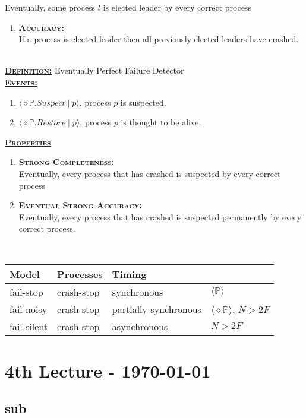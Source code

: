\documentclass{article}
\begin{document}
\begin{adjustwidth}{2em}{2em}
\begin{adjustwidth}{2em}{2em}
			Eventually, some process $l$ is elected leader by every correct process
			\begin{enumerate}[]
				\item \textbf{\textsc{Accuracy:}} \\
				If a process is elected leader then all previously elected leaders have crashed.
			\end{enumerate}
			\hfill \\
			\underline{\textbf{\textsc{Definition:}}} Eventually Perfect Failure Detector \\
			\underline{\textbf{\textsc{Events:}}} 
			\begin{enumerate}[]
				\item $\langle \diamond \mathbb{P}.\textit{Suspect} \mid p \rangle$, process $p$ is suspected.
				\item $\langle \diamond \mathbb{P}.\textit{Restore} \mid p \rangle$, process $p$ is thought to be alive.
			\end{enumerate}
			\underline{\textbf{\textsc{Properties}}}
			\begin{enumerate}[]
				\item \textbf{\textsc{Strong Completeness:}} \\
				Eventually, every process that has crashed is suspected by every correct process
				\item \textbf{\textsc{Eventual Strong Accuracy:}} \\
				Eventually, every process that has crashed is suspected permanently by every correct process.
			\end{enumerate}
			\hfill \\
			\begin{center}
				\begin{tabular}{|l|l|l|l|}
					\hline
					Model & Processes & Timing & \\
					\hline
					fail-stop & crash-stop & synchronous & $\langle \mathbb{P} \rangle$ \\
					fail-noisy & crash-stop & partially synchronous & $\langle \diamond\mathbb{P} \rangle$, $N > 2F$ \\
					fail-silent & crash-stop & asynchronous & $N > 2F$ \\
					\hline
				\end{tabular}
			\end{center}
		\end{adjustwidth}
	\end{adjustwidth}
	
	\newpage
	
	\section{4th Lecture - \today}
	\begin{adjustwidth}{2em}{2em}
		\subsection{sub}
		\begin{adjustwidth}{2em}{2em}
		\end{adjustwidth}
	\end{adjustwidth}
\end{document}
